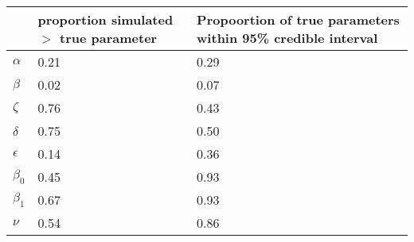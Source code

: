 \begin{table}[ht]
\centering
\begin{tabular}{lp{1.5in}p{1.5in}}
  \hline
 & proportion simulated $>$ true parameter & Propoortion of true parameters 
 within 95\% credible interval \\ 
  \hline
$\alpha$ & 0.21 & 0.29 \\ 
  $\beta$ & 0.02 & 0.07 \\ 
  $\zeta$ & 0.76 & 0.43 \\ 
  $\delta$ & 0.75 & 0.50 \\ 
  $\epsilon$ & 0.14 & 0.36 \\ 
  $\beta_0$ & 0.45 & 0.93 \\ 
  $\beta_1$ & 0.67 & 0.93 \\ 
  $\nu$ & 0.54 & 0.86 \\ 
   \hline
\end{tabular}
\end{table}
